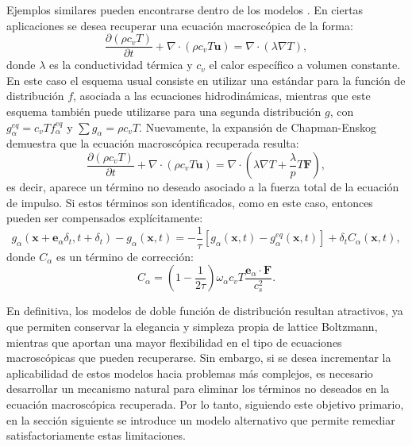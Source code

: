 Ejemplos similares pueden encontrarse dentro de los modelos \pp{} \cite{li_effect_2014}. En ciertas aplicaciones se desea recuperar una ecuaci\'on macrosc\'opica de la forma:
\begin{equation}
	\dfrac{\partial (\rho c_v T)}{\partial t} + \nabla \cdot (\rho c_v T \bm{u}) = \nabla \cdot (\lambda \nabla T),
\end{equation}
donde $\lambda$ es la conductividad t\'ermica y $c_v$ el calor espec\'ifico a volumen constante. En este caso el esquema usual consiste en utilizar una \lbe{} \pp{} est\'andar para la funci\'on de distribuci\'on $f$, asociada a las ecuaciones hidrodin\'amicas, mientras que este esquema tambi\'en puede utilizarse para una segunda distribuci\'on $g$, con $g^{eq}_{\alpha} = c_v T f^{eq}_{\alpha}$ y $\sum g_{\alpha} = \rho c_v T$. Nuevamente, la expansi\'on de Chapman-Enskog demuestra que la ecuaci\'on macrosc\'opica recuperada resulta:
\begin{equation}
	\dfrac{\partial (\rho c_v T)}{\partial t} + \nabla \cdot (\rho c_v T \bm{u}) = \nabla \cdot \left(\lambda \nabla T + \dfrac{\lambda}{p}T\bm{F} \right),
\end{equation}
es decir, aparece un t\'ermino no deseado asociado a la fuerza total de la ecuaci\'on de impulso. Si estos t\'erminos son identificados, como en este caso, entonces pueden ser compensados expl\'icitamente:
\begin{equation}
	g_{\alpha}(\bm{x}+\bm{e}_{\alpha}\delta_t, t+\delta_t) - g_{\alpha}(\bm{x},t) = -\dfrac{1}{\tau} \left[ g_{\alpha}(\bm{x},t) - g^{eq}_{\alpha}(\bm{x},t) \right] + \delta_t C_{\alpha}(\bm{x},t),
\end{equation}
donde $C_{\alpha}$ es un t\'ermino de correcci\'on:
\begin{equation}
	C_{\alpha} = \left( 1-\dfrac{1}{2\tau} \right)\omega_{\alpha}c_v T \dfrac{\bm{e}_{\alpha} \cdot \bm{F}}{c_s^2}.
\end{equation}

En definitiva, los modelos de doble funci\'on de distribuci\'on resultan atractivos, ya que permiten conservar la elegancia y simpleza propia de lattice Boltzmann, mientras que aportan una mayor flexibilidad en el tipo de ecuaciones macrosc\'opicas que pueden recuperarse. Sin embargo, si se desea incrementar la aplicabilidad de estos modelos hacia problemas m\'as complejos, es necesario desarrollar un mecanismo natural para eliminar los t\'erminos no deseados en la ecuaci\'on macrosc\'opica recuperada. Por lo tanto, siguiendo este objetivo primario, en la secci\'on siguiente se introduce un modelo alternativo que permite remediar satisfactoriamente estas limitaciones.


